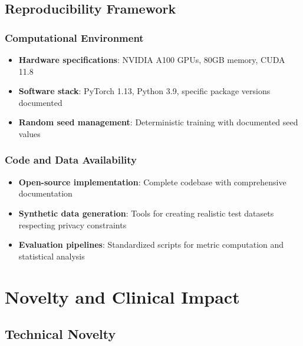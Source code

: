 \documentclass[11pt]{article}
\begin{document}
\subsection{Reproducibility Framework}

\subsubsection{Computational Environment}
\begin{itemize}
    \item \textbf{Hardware specifications}: NVIDIA A100 GPUs, 80GB memory, CUDA 11.8
    \item \textbf{Software stack}: PyTorch 1.13, Python 3.9, specific package versions documented
    \item \textbf{Random seed management}: Deterministic training with documented seed values
\end{itemize}

\subsubsection{Code and Data Availability}
\begin{itemize}
    \item \textbf{Open-source implementation}: Complete codebase with comprehensive documentation
    \item \textbf{Synthetic data generation}: Tools for creating realistic test datasets respecting privacy constraints
    \item \textbf{Evaluation pipelines}: Standardized scripts for metric computation and statistical analysis
\end{itemize}

\section{Novelty and Clinical Impact}
\label{sec:novelty}

\subsection{Technical Novelty}
\end{document}
